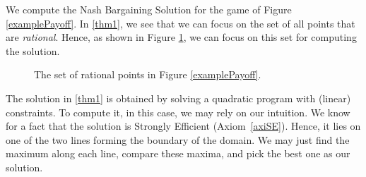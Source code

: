 \begin{example}
We compute the Nash Bargaining Solution for the game of Figure \ref{examplePayoff}.
In \eqref{thm1}, we see that we can focus on the set of all points that are \emph{rational}. Hence, as shown in Figure \ref{example2Payoff}, we can focus on this set for computing the solution.

\begin{figure}[!ht]
\centering
{}
\caption{The set of rational points in Figure \ref{examplePayoff}.}
\label{example2Payoff}
\end{figure}

The solution in \eqref{thm1} is obtained by solving a quadratic program with (linear) constraints.
To compute it,  in this case, we may rely on our intuition.
We know for a fact that the solution is Strongly Efficient (Axiom~\ref{axiSE}). Hence, it lies on one of the two lines forming the boundary of the domain.
We may just find the maximum along each line, compare these maxima, and pick the best one as our solution.


\end{example}
